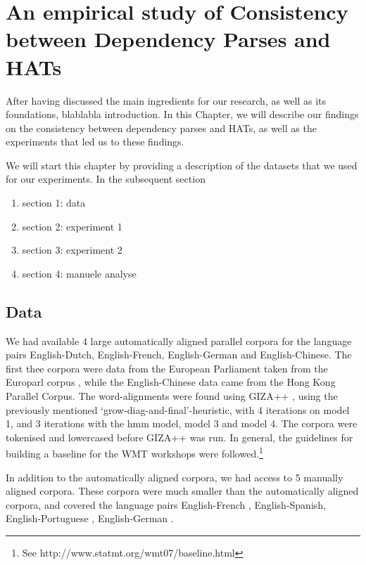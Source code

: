 \documentclass[hidelinks]{report}
\begin{document}
\chapter{An empirical study of Consistency between Dependency Parses and HATs}

After having discussed the main ingredients for our research, as well as its foundations, blablabla introduction. In this Chapter, we will describe our findings on the consistency between dependency parses and HATs, as well as the experiments that led us to these findings.

We will start this chapter by providing a description of the datasets that we used for our experiments. In the subsequent section\begin{enumerate}
\item section 1: data
\item section 2: experiment 1
\item section 3: experiment 2
\item section 4: manuele analyse
\end{enumerate}

\section{Data}

We had available 4 large automatically aligned parallel corpora for the language pairs English-Dutch, English-French, English-German and English-Chinese. The first thee corpora were data from the European Parliament taken from the Europarl corpus \citep{koehn2005europarl}, while the English-Chinese data came from the Hong Kong Parallel Corpus. The word-alignments were found using GIZA++ \citep{och03:asc}, using the previously mentioned `grow-diag-and-final'-heuristic, with 4 iterations on model 1, and 3 iterations with the hmm model, model 3 and model 4. The corpora were tokenised and lowercased before GIZA++ was run. In general, the guidelines for building a baseline for the WMT workshops were followed.\footnote{See http://www.statmt.org/wmt07/baseline.html}

In addition to the automatically aligned corpora, we had access to 5 manually aligned corpora. These corpora were much smaller than the automatically aligned corpora, and covered the language pairs English-French \citep{graca2008building,och2000improved}, English-Spanish, English-Portuguese \citep{graca2008building}, English-German \citep{pado2006optimal}.
\end{document}
